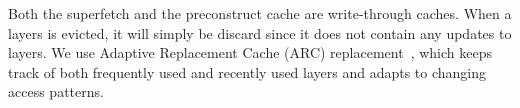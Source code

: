 Both the superfetch and the preconstruct cache are write-through caches.
When a layers is evicted, it will simply be discard since it does not contain any
updates to layers.
%
We use Adaptive Replacement Cache (ARC) replacement~\cite{xxx}, 
which keeps track of both frequently used and recently used layers
and adapts to changing access patterns.
%


%
%


